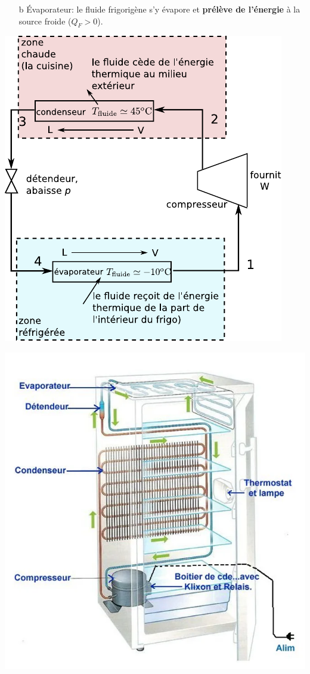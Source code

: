 \documentclass[../../main/main.tex]{subfiles}
\begin{document}
\begin{tcb}
\begin{isd}
\begin{enumerate}[start=3]
			\item[b]{Évaporateur}: le fluide frigorigène s'y évapore et
			\textbf{prélève de l'énergie} à la source froide ($Q_F > 0$).
		\end{enumerate}
	\end{isd}
	\begin{isd}
		\begin{center}
			\includegraphics[width=.8\linewidth]{frigo_schema}
		\end{center}
		\tcblower
		\begin{center}
			\includegraphics[width=.9\linewidth]{frigo_schema_reel-2}
		\end{center}
	\end{isd}
\end{tcb}
\end{document}
